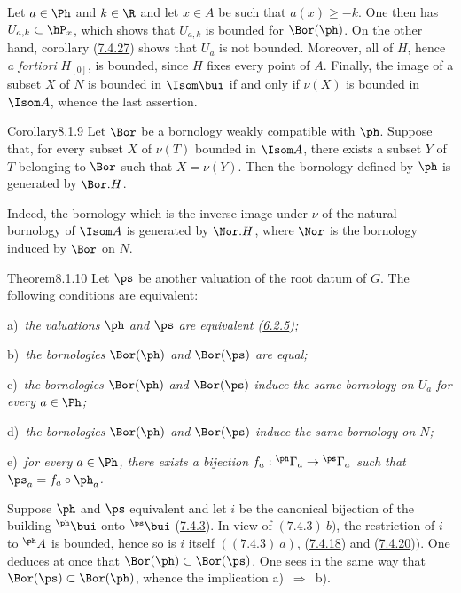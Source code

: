 \documentclass[12pt,a4paper,oneside,english]{smfart}
\makeatletter
\newcommand{\btanchor}[1]{\leavevmode\Hy@raisedlink{\hypertarget{bt:#1}{}}}
\newcommand{\btref}[1]{\hyperlink{bt:#1}{#1}}
\theoremstyle{definition}
\theoremstyle{bt}
\makeatother
\begin{document}
Let $a\in\Ph$ and $k\in\R$ and let $x\in A$ be such that $a(x)\geqslant-k$. One then has
$U_{a,k}\subset\hP_x$, which shows that $U_{a,k}$ is bounded for $\Bor(\ph)$. On the
other hand, corollary (\btref{7.4.27}) shows that $U_a$ is not bounded. Moreover, all of $H$,
hence \emph{a fortiori} $H_{[0]}$, is bounded, since $H$ fixes every point of $A$.
Finally, the image of a subset $X$ of $N$ is bounded in $\Isom\bui$ if and only if
$\nu(X)$ is bounded in $\Isom A$, whence the last assertion.

\begin{stmt}{Corollary}{8.1.9}\btanchor{8.1.9}
Let $\Bor$ be a bornology weakly compatible with $\ph$. Suppose that, for every subset
$X$ of $\nu(T)$ bounded in $\Isom A$, there exists a subset $Y$ of $T$ belonging to
$\Bor$ such that $X=\nu(Y)$. Then the bornology defined by $\ph$ is generated by
$\Bor.H$.
\end{stmt}

Indeed, the bornology which is the inverse image under $\nu$ of the natural bornology of
$\Isom A$ is generated by $\Nor.H$, where $\Nor$ is the bornology induced by $\Bor$
on $N$.

\begin{stmt}{Theorem}{8.1.10}\btanchor{8.1.10}
Let $\ps$ be another valuation of the root datum of $G$. The following conditions are
equivalent:

\upshape a)\itshape\ the valuations $\ph$ and $\ps$ are equivalent (\btref{6.2.5});

\upshape b)\itshape\ the bornologies $\Bor(\ph)$ and $\Bor(\ps)$ are equal;

\upshape c)\itshape\ the bornologies $\Bor(\ph)$ and $\Bor(\ps)$ induce the same
bornology on $U_a$ for every $a\in\Ph$;

\upshape d)\itshape\ the bornologies $\Bor(\ph)$ and $\Bor(\ps)$ induce the same
bornology on $N$;

\upshape e)\itshape\ for every $a\in\Ph$, there exists a bijection
$f_a:{}^{\ph}\Gamma_a\to{}^{\ps}\Gamma_a$ such that $\ps_a=f_a\circ\ph_a$.
\end{stmt}

Suppose $\ph$ and $\ps$ equivalent and let $i$ be the canonical bijection of the
building ${}^{\ph}\bui$ onto ${}^{\ps}\bui$ (\btref{7.4.3}). In view of $(7.4.3)\ b)$, the
restriction of $i$ to ${}^{\ph}A$ is bounded, hence so is $i$ itself
$((7.4.3)\ a)$, (\btref{7.4.18}) and (\btref{7.4.20})$)$. One deduces at once that
$\Bor(\ph)\subset\Bor(\ps)$. One sees in the same way that
$\Bor(\ps)\subset\Bor(\ph)$, whence the implication a)~$\Rightarrow$~b).
\end{document}
